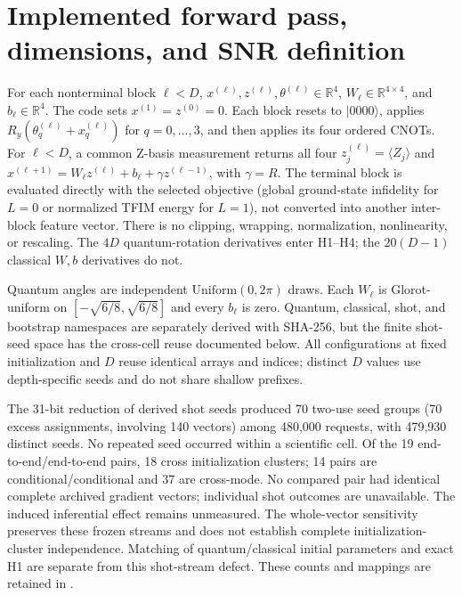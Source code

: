 \documentclass[pdflatex,sn-basic,Numbered]{sn-jnl}
\begin{document}
\section{Implemented forward pass, dimensions, and SNR definition}

For each nonterminal block $\ell<D$, $x^{(\ell)},z^{(\ell)},\theta^{(\ell)}\in\mathbb{R}^4$, $W_\ell\in\mathbb{R}^{4\times4}$, and $b_\ell\in\mathbb{R}^4$. The code sets $x^{(1)}=z^{(0)}=0$. Each block resets to $|0000\rangle$, applies $R_y(\theta_q^{(\ell)}+x_q^{(\ell)})$ for $q=0,\ldots,3$, and then applies its four ordered CNOTs. For $\ell<D$, a common Z-basis measurement returns all four $z_j^{(\ell)}=\langle Z_j\rangle$ and $x^{(\ell+1)}=W_\ell z^{(\ell)}+b_\ell+\gamma z^{(\ell-1)}$, with $\gamma=R$. The terminal block is evaluated directly with the selected objective (global ground-state infidelity for $L=0$ or normalized TFIM energy for $L=1$), not converted into another inter-block feature vector. There is no clipping, wrapping, normalization, nonlinearity, or rescaling. The $4D$ quantum-rotation derivatives enter H1--H4; the $20(D-1)$ classical $W,b$ derivatives do not.

Quantum angles are independent $\mathrm{Uniform}(0,2\pi)$ draws. Each $W_\ell$ is Glorot-uniform on $[-\sqrt{6/8},\sqrt{6/8}]$ and every $b_\ell$ is zero. Quantum, classical, shot, and bootstrap namespaces are separately derived with SHA-256, but the finite shot-seed space has the cross-cell reuse documented below. All configurations at fixed initialization and $D$ reuse identical arrays and indices; distinct $D$ values use depth-specific seeds and do not share shallow prefixes.

The 31-bit reduction of derived shot seeds produced 70 two-use seed groups (70 excess assignments, involving 140 vectors) among 480,000 requests, with 479,930 distinct seeds. No repeated seed occurred within a scientific cell. Of the 19 end-to-end/end-to-end pairs, 18 cross initialization clusters; 14 pairs are conditional/conditional and 37 are cross-mode. No compared pair had identical complete archived gradient vectors; individual shot outcomes are unavailable. The induced inferential effect remains unmeasured. The whole-vector sensitivity preserves these frozen streams and does not establish complete initialization-cluster independence. Matching of quantum/classical initial parameters and exact H1 are separate from this shot-stream defect. These counts and mappings are retained in .
\end{document}
